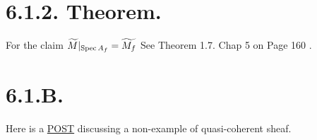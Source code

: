 \section{6.1.2. Theorem.}

For the claim $\widetilde{M}\vert_{\operatorname{Spec} A_f}=\widetilde{M_f}$ See Theorem 1.7. Chap 5 on Page 160 \cite{qing2006algebraic}.

\section{6.1.B.}

Here is a \href{https://math.stackexchange.com/questions/467197/examples-of-mathcalo-x-modules-that-are-not-quasi-coherent-sheaves}{POST} discussing a non-example of quasi-coherent sheaf.